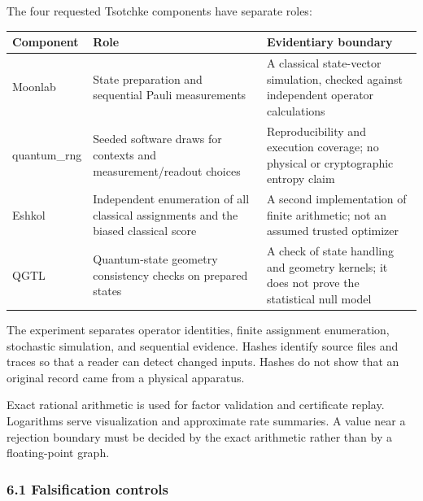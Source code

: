 \documentclass[10pt,a4paper]{article}
\begin{document}
The four requested Tsotchke components have separate roles:

{\def\LTcaptype{none} %
\begin{longtable}[]{@{}
  >{\raggedright\arraybackslash}p{}
  >{\raggedright\arraybackslash}p{}
  >{\raggedright\arraybackslash}p{}@{}}
\toprule\noalign{}
\begin{minipage}[b]{\linewidth}\raggedright
Component
\end{minipage} & \begin{minipage}[b]{\linewidth}\raggedright
Role
\end{minipage} & \begin{minipage}[b]{\linewidth}\raggedright
Evidentiary boundary
\end{minipage} \\
\midrule\noalign{}
\endhead
\bottomrule\noalign{}
\endlastfoot
Moonlab & State preparation and sequential Pauli measurements & A
classical state-vector simulation, checked against independent operator
calculations \\
quantum\_rng & Seeded software draws for contexts and
measurement/readout choices & Reproducibility and execution coverage; no
physical or cryptographic entropy claim \\
Eshkol & Independent enumeration of all classical assignments and the
biased classical score & A second implementation of finite arithmetic;
not an assumed trusted optimizer \\
QGTL & Quantum-state geometry consistency checks on prepared states & A
check of state handling and geometry kernels; it does not prove the
statistical null model \\
\end{longtable}
}

The experiment separates operator identities, finite assignment
enumeration, stochastic simulation, and sequential evidence. Hashes
identify source files and traces so that a reader can detect changed
inputs. Hashes do not show that an original record came from a physical
apparatus.

Exact rational arithmetic is used for factor validation and certificate
replay. Logarithms serve visualization and approximate rate summaries. A
value near a rejection boundary must be decided by the exact arithmetic
rather than by a floating-point graph.

\subsubsection{6.1 Falsification controls}\label{falsification-controls}
\end{document}
